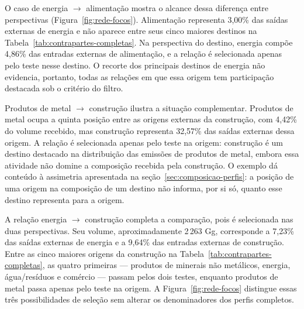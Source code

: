 O caso de energia $\rightarrow$ alimentação mostra o alcance dessa diferença entre perspectivas (Figura~\ref{fig:rede-focos}). Alimentação representa 3,00\% das saídas externas de energia e não aparece entre seus cinco maiores destinos na Tabela~\ref{tab:contrapartes-completas}. Na perspectiva do destino, energia compõe 4,86\% das entradas externas de alimentação, e a relação é selecionada apenas pelo teste nesse destino. O recorte dos principais destinos de energia não evidencia, portanto, todas as relações em que essa origem tem participação destacada sob o critério do filtro.

Produtos de metal $\rightarrow$ construção ilustra a situação complementar. Produtos de metal ocupa a quinta posição entre as origens externas da construção, com 4,42\% do volume recebido, mas construção representa 32,57\% das saídas externas dessa origem. A relação é selecionada apenas pelo teste na origem: construção é um destino destacado na distribuição das emissões de produtos de metal, embora essa atividade não domine a composição recebida pela construção. O exemplo dá conteúdo à assimetria apresentada na seção~\ref{sec:composicao-perfis}: a posição de uma origem na composição de um destino não informa, por si só, quanto esse destino representa para a origem.

A relação energia $\rightarrow$ construção completa a comparação, pois é selecionada nas duas perspectivas. Seu volume, aproximadamente 2\,263 Gg, corresponde a 7,23\% das saídas externas de energia e a 9,64\% das entradas externas de construção. Entre as cinco maiores origens da construção na Tabela~\ref{tab:contrapartes-completas}, as quatro primeiras --- produtos de minerais não metálicos, energia, água/resíduos e comércio --- passam pelos dois testes, enquanto produtos de metal passa apenas pelo teste na origem. A Figura~\ref{fig:rede-focos} distingue essas três possibilidades de seleção sem alterar os denominadores dos perfis completos.

